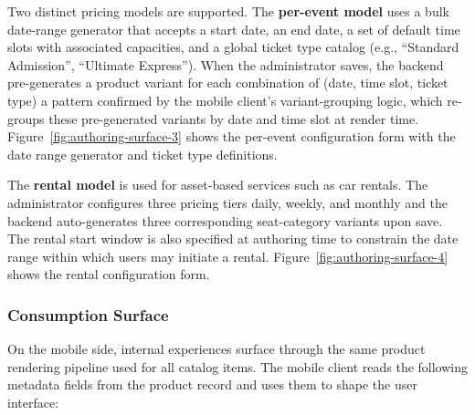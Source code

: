 

Two distinct pricing models are supported. The \textbf{per-event model} uses a bulk date-range generator that accepts a start date, an end date, a set of default time slots with associated capacities, and a global ticket type catalog (e.g., ``Standard Admission'', ``Ultimate Express''). When the administrator saves, the backend pre-generates a product variant for each combination of (date, time slot, ticket type) a pattern confirmed by the mobile client's variant-grouping logic, which re-groups these pre-generated variants by date and time slot at render time. Figure~\ref{fig:authoring-surface-3} shows the per-event configuration form with the date range generator and ticket type definitions.


The \textbf{rental model} is used for asset-based services such as car rentals. The administrator configures three pricing tiers daily, weekly, and monthly and the backend auto-generates three corresponding seat-category variants upon save. The rental start window is also specified at authoring time to constrain the date range within which users may initiate a rental. Figure~\ref{fig:authoring-surface-4} shows the rental configuration form.


\subsubsection{Consumption Surface}
\label{subsubsection:Consumption Surface}
On the mobile side, internal experiences surface through the same product rendering pipeline used for all catalog items. The mobile client reads the following metadata fields from the product record and uses them to shape the user interface:

